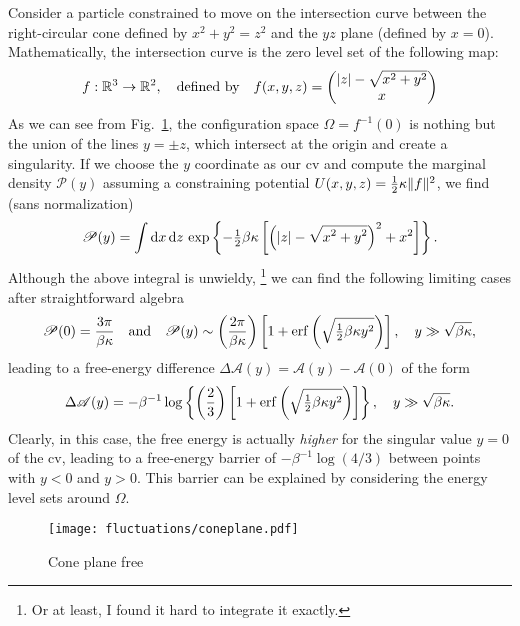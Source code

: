 \begin{subappendices}
Consider a particle constrained to move on the intersection curve between the right-circular cone defined by $x^{2} + y^{2} = z^{2}$ and the $yz$ plane (defined by $x = 0$).
Mathematically, the intersection curve is the zero level set of the following map:
%
\begin{equation}
  f: \mathbb{R}^{3} \to \mathbb{R}^{2},
  \quad\text{defined by}\quad
  f(x,y,z) =
  \begin{pmatrix}
    \lvert z\rvert - \sqrt{x^{2} + y^{2}}\\
    x
  \end{pmatrix}
\end{equation}
%
As we can see from Fig.~\ref{fig:coneplane}, the configuration space $\Omega = f^{-1}(0)$ is nothing but the union of the lines $y = \pm z$, which intersect at the origin and create a singularity.
If we choose the $y$ coordinate as our \ac{cv} and compute the marginal density $\mathscr{P}(y)$ assuming a constraining potential $U(x, y, z) = \frac{1}{2}\kappa\lVert f\rVert^{2}$, we find (sans normalization)
%
\begin{equation}
  \mathscr{P}(y) = \int \mathrm{d}{x}\,\mathrm{d}{z}\,\exp\left\{-\tfrac{1}{2}\beta\kappa\left[\left(\smash[b]{\lvert z\rvert - \sqrt{\smash[b]{x^{2} + y^{2}}}}\right)^{2} + x^{2}\right]\right\}.
\end{equation}
%
Although the above integral is unwieldy,%
\footnote{Or at least, I found it hard to integrate it exactly.}
we can find the following limiting cases after straightforward algebra
%
\begin{equation}
  \mathscr{P}(0) = \frac{3\pi}{\beta\kappa}
  \quad\text{and}\quad
  \mathscr{P}(y) \sim \left(\frac{2\pi}{\beta\kappa}\right)\left[1+\operatorname{erf}\left(\sqrt{\tfrac{1}{2}{\beta\kappa y^{2}}}\right)\right],
  \quad y \gg \sqrt{\smash[b]{\beta\kappa}},
\end{equation}
%
leading to a free-energy difference $\Delta\mathscr{A}(y) = \mathscr{A}(y) - \mathscr{A}(0)$ of the form
%
\begin{equation}
  \Delta\mathscr{A}(y) = -\beta^{-1} \log\left\{\left(\frac{2}{3}\right)\left[1+\operatorname{erf}\left(\sqrt{\tfrac{1}{2}{\beta\kappa y^{2}}}\right)\right]\right\},
  \quad y \gg \sqrt{\smash[b]{\beta\kappa}}.
\end{equation}
%
Clearly, in this case, the free energy is actually \emph{higher} for the singular value $y = 0$ of the \ac{cv}, leading to a free-energy barrier of $-\beta^{-1}\log(4/3)$ between points with $y < 0$ and $y > 0$.
This barrier can be explained by considering the energy level sets around $\Omega$.
%
\begin{figure}
  \begin{center}
    \texttt{[image: fluctuations/coneplane.pdf]}
  \end{center}
  \caption{Cone plane free}
  \label{fig:coneplane}
\end{figure}

\end{subappendices}
